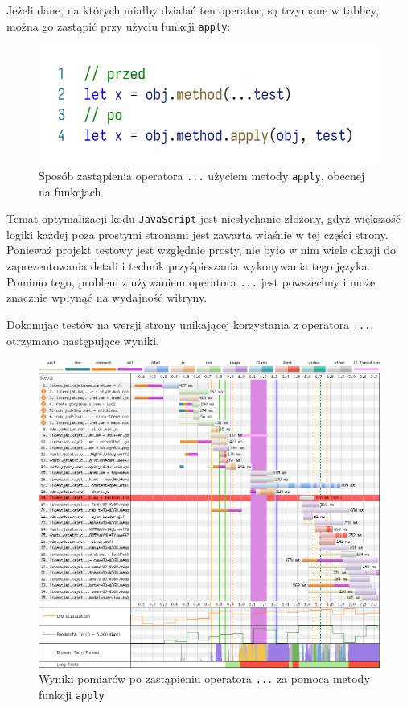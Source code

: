 \documentclass[licencjacka]{pracadypl}
\begin{document}
Jeżeli dane, na których miałby działać ten operator, są trzymane w tablicy, można go zastąpić przy użyciu funkcji \texttt{apply}:
\begin{figure}[H]
  \centering
  \includegraphics[width=\linewidth]{images/code-js-spread-operator.png}
  \caption{Sposób zastąpienia operatora \texttt{...} użyciem metody \texttt{apply}, obecnej na funkcjach}
  \label{fig:code-js-spread-operator}
\end{figure}

Temat optymalizacji kodu \texttt{JavaScript} jest niesłychanie złożony, gdyż większość logiki każdej poza prostymi stronami jest zawarta właśnie w tej części strony. Ponieważ projekt testowy jest względnie prosty, nie było w nim wiele okazji do zaprezentowania detali i technik przyśpieszania wykonywania tego języka. Pomimo tego, problem z używaniem operatora \texttt{...} jest powszechny i może znacznie wpłynąć na wydajność witryny.

Dokonując testów na wersji strony unikającej korzystania z operatora \texttt{...}, otrzymano następujące wyniki. 

\begin{figure}[H]
  \centering
  \includegraphics[width=\linewidth]{images/waterfall-after-no-array-spread.png}
  \caption{Wyniki pomiarów po zastąpieniu operatora \texttt{...} za pomocą metody funkcji \texttt{apply}}
  \label{fig:waterfall-after-no-array-spread}
\end{figure}
\end{document}
